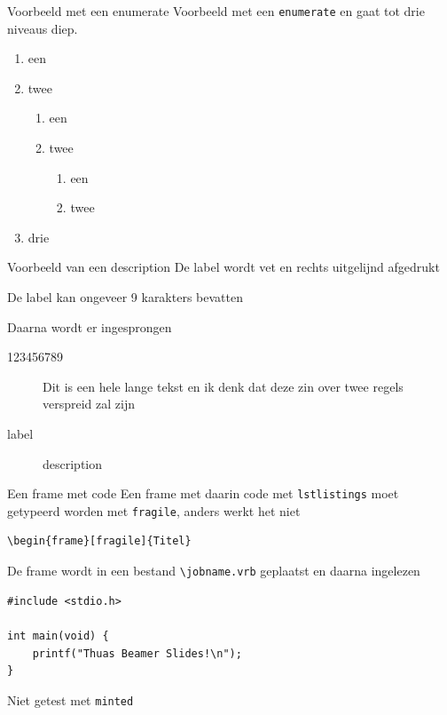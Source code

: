 \documentclass[fleqn,aspectratio=169,dutch]{beamer}
\begin{document}
\begin{frame}{Voorbeeld met een enumerate}
Voorbeeld met een \texttt{enumerate} en gaat tot drie niveaus diep.
\begin{enumerate}
\item een
\item twee
\begin{enumerate}
\item een
\item twee
\begin{enumerate}
\item een
\item twee
\end{enumerate}
\end{enumerate}
\item drie
\end{enumerate}
\end{frame}


\begin{frame}{Voorbeeld van een description}
De label wordt vet en rechts uitgelijnd afgedrukt

De label kan ongeveer 9 karakters bevatten

Daarna wordt er ingesprongen
\begin{description}
\item[123456789] Dit is een hele lange tekst en ik denk dat deze zin over twee regels verspreid zal zijn
\item[label] description
\end{description}
\end{frame}

\begin{frame}[fragile]{Een frame met code}
Een frame met daarin code met \texttt{lstlistings} moet getypeerd worden met \texttt{fragile}, anders werkt het niet

\begin{lstlisting}
\begin{frame}[fragile]{Titel}
\end{lstlisting}

De frame wordt in een bestand \lstinline|\jobname.vrb| geplaatst en daarna ingelezen

\begin{lstlisting}
#include <stdio.h>

int main(void) {
    printf("Thuas Beamer Slides!\n");
}
\end{lstlisting}

Niet getest met \lstinline|minted|
\end{frame}
\end{document}
